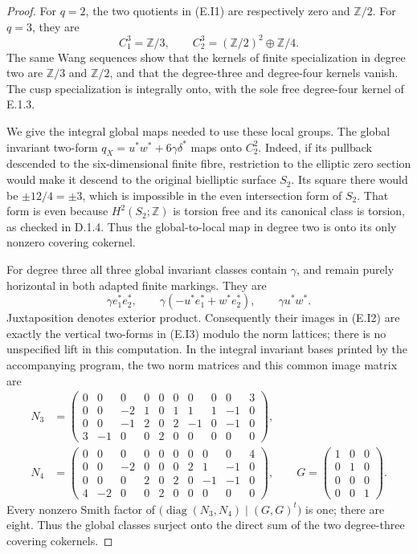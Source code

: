 \begin{proof}
For \(q=2\), the two quotients in (E.I1) are respectively zero
and \(\mathbb Z/2\). For \(q=3\), they are
\[
 C_1^3=\mathbb Z/3,\qquad
 C_2^3=(\mathbb Z/2)^2\oplus\mathbb Z/4.
 \tag{E.I2}
\]
The same Wang sequences show that the kernels of finite
specialization in degree two are \(\mathbb Z/3\) and
\(\mathbb Z/2\), and that the degree-three and degree-four
kernels vanish. The cusp specialization is integrally onto,
with the sole free degree-four kernel of E.1.3.

We give the integral global maps needed to use these local groups.
The global invariant two-form
\(q_X=u^*w^*+6\gamma\delta^*\) maps onto \(C_2^2\).
Indeed, if its pullback descended to the six-dimensional finite
fibre, restriction to the elliptic zero section would make it
descend to the original bielliptic surface \(S_2\). Its square
there would be \(\pm12/4=\pm3\), which is impossible in the
even intersection form of \(S_2\). That form is even because
\(H^2(S_2;\mathbb Z)\) is torsion free and its canonical class
is torsion, as checked in D.1.4. Thus the global-to-local map in
degree two is onto its only nonzero covering cokernel.

For degree three all three global invariant classes contain
\(\gamma\), and remain purely horizontal in both adapted
finite markings. They are
\[
 \gamma e_1^*e_2^*,\qquad
 \gamma(-u^*e_1^*+w^*e_2^*),\qquad
 \gamma u^*w^* .
 \tag{E.I3}
\]
Juxtaposition denotes exterior product. Consequently their images
in (E.I2) are exactly the vertical two-forms in (E.I3) modulo the
norm lattices; there is no unspecified lift in this computation.
In the integral invariant bases printed by the accompanying program,
the two norm matrices and this common image matrix are
\[
\begin{split}
N_3&=\begin{pmatrix}
0&0&0&0&0&0&0&0&0&3\\
0&0&-2&1&0&1&1&1&-1&0\\
0&0&-1&2&0&2&-1&0&-1&0\\
3&-1&0&0&2&0&0&0&0&0
\end{pmatrix},\\
N_4&=\begin{pmatrix}
0&0&0&0&0&0&0&0&0&4\\
0&0&-2&0&0&0&2&1&-1&0\\
0&0&0&2&0&2&0&-1&-1&0\\
4&-2&0&0&2&0&0&0&0&0
\end{pmatrix},\qquad
G=\begin{pmatrix}1&0&0\\0&1&0\\0&0&0\\0&0&1\end{pmatrix}.
\end{split}
\]
Every nonzero Smith factor of
\(\bigl(\operatorname{diag}(N_3,N_4)\mid(G,G)^t\bigr)\)
is one; there are eight. Thus the global classes surject onto
the direct sum of the two degree-three covering cokernels.


\end{proof}
